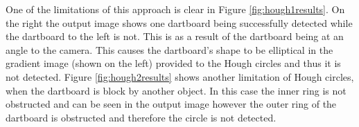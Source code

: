 \documentclass{article}
\begin{document}
\begin{multicols}{2}
One of the limitations of this approach is clear in Figure \ref{fig:hough1results}. On
the right the output image shows one dartboard being successfully detected
while the dartboard to the left is not. This is as a result of the dartboard
being at an angle to the camera. This causes the dartboard's shape to be
elliptical in the gradient image (shown on the left) provided to the Hough circles and thus it is not detected. Figure
\ref{fig:hough2results} shows another limitation of Hough circles, when the dartboard is
block by another object. In this case the inner ring is not obstructed and can
be seen in the output image however the outer ring of the dartboard is
obstructed and therefore the circle is not detected.

\begin{multicols}{2}
\end{multicols}
\end{multicols}
\end{document}
